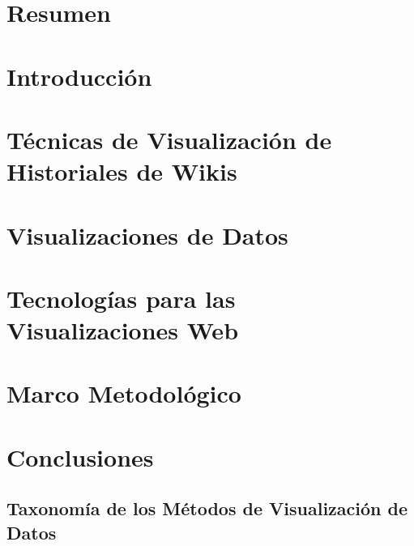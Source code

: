 \documentclass[12pt, twoside]{report}
\begin{document}


\chapter*{Resumen}


\tableofcontents

\listoffigures

\listoftables

\chapter*{Introducción}


\chapter{Técnicas de Visualización de Historiales de Wikis}


\chapter{Visualizaciones de Datos}


\chapter{Tecnologías para las Visualizaciones Web}


\chapter{Marco Metodológico}


\chapter*{Conclusiones}


\begin{appendices}
  \chapter{Taxonomía de los Métodos de Visualización de Datos}
  
\end{appendices}

\printbibliography
\end{document}
